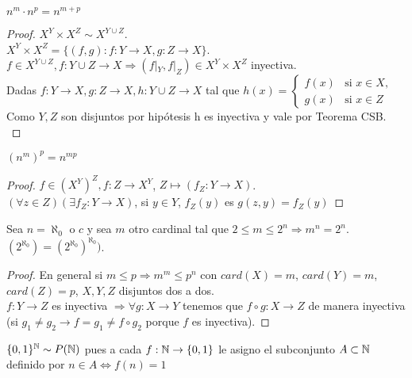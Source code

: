 \begin{prop}
    $n^m \cdot n^p = n^{m+p}$ \\ 
    \begin{proof}
        $X^Y \times X^Z \sim X^{Y \cup Z}$. \\
        $X^Y \times X^Z = \{ (f, g) : f: Y \to X, g: Z \to X \}$. \\
        $f \in X^{Y \cup Z}, f: Y \cup Z \to X \Rightarrow (f|_Y, f|_Z) \in X^Y \times X^Z$ inyectiva. \\
        Dadas $f: Y \to X, g: Z \to X, h: Y \cup Z \to X$ tal que $h(x) = \begin{cases}
          f(x) & \text{si } x \in X, \\
          g(x) & \text{si } x \in Z
        \end{cases}$ \\
        Como $Y, Z$ son disjuntos por hipótesis h es inyectiva y vale por Teorema CSB. \\
    \end{proof}
\end{prop}

\begin{prop}
  $(n^m)^p = n^{mp}$
  \begin{proof}
    $f \in (X^Y)^Z, f: Z \to X^Y$, $Z \mapsto (f_Z: Y \to X)$. \\
    $(\forall z \in Z)(\exists f_Z: Y \to X)$, si $y \in Y$, $f_Z(y)$ es $g(z, y) = f_Z(y)$ 
  \end{proof}
\end{prop}

\begin{theorem}
  Sea $n = \aleph_0$ o $c$ y sea $m$ otro cardinal tal que $2 \leq m \leq 2^n \Rightarrow m^n = 2^n$. $(2^{\aleph_0}) = (2^{\aleph_0})^{\aleph_0})$.
  \begin{proof}
  En general si $m \leq p \Rightarrow m^m \leq p^n$ con $card(X) = m$, $card(Y) = m$, $card(Z) = p$, $X,Y,Z$ disjuntos dos a dos. \\
    $f: Y \to Z$ es inyectiva $\Rightarrow \forall g: X \to Y$ tenemos que $f \circ g: X \to Z$ de manera inyectiva (si $g_1 \neq g_2 \to f = g_1 \neq f \circ g_2$ porque $f$ es inyectiva).
  \end{proof}
\end{theorem}

\begin{note}
  $\{ 0, 1 \}^{\mathbb{N}} \sim P(\mathbb{N})$ pues a cada $f: \mathbb{N} \to \{0, 1\}$ le asigno el subconjunto $A \subset \mathbb{N}$ definido por $n \in A \iff f(n) = 1$
\end{note}
  
